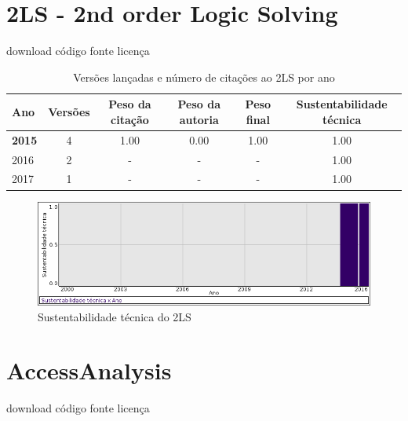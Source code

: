 
%

\label{softwares-summary}

\section{2LS - 2nd order Logic Solving}
\checkmark download
\checkmark código fonte
\checkmark licença


\begin{table}[H]
\caption{Versões lançadas e número de citações ao 2LS por ano}
\centering
\begin{tabular}{| l | c | c | c | c | c |}
  \hline
  Ano & Versões & Peso da citação & Peso da autoria & Peso final & Sustentabilidade técnica \\
  \hline
            {\bf 2015}
          &
          4
          &
          1.00
          &
          0.00
          &
          1.00
          &
            {\color{blue} 1.00}
          \\
\hline
        2016 & 2 & - & - & -
        &
          {\color{blue} 1.00}
        \\
\hline
        2017 & 1 & - & - & -
        &
          {\color{blue} 1.00}
        \\
\hline
\end{tabular}
\end{table}

\begin{figure}[h]
  \center
  \includegraphics[scale=0.50]{imagens/softwares-charts/2ls.png}
  \caption{Sustentabilidade técnica do 2LS}
\end{figure}


\section{AccessAnalysis}
\checkmark download
\checkmark código fonte
\checkmark licença



